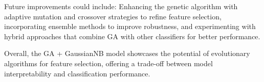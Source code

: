 Future improvements could include: Enhancing the genetic algorithm with adaptive mutation and crossover strategies to refine feature selection, incorporating ensemble methods to improve robustness, and experimenting with hybrid approaches that combine GA with other classifiers for better performance.

Overall, the GA + GaussianNB model showcases the potential of evolutionary algorithms for feature selection, offering a trade-off between model interpretability and classification performance.

\newpage